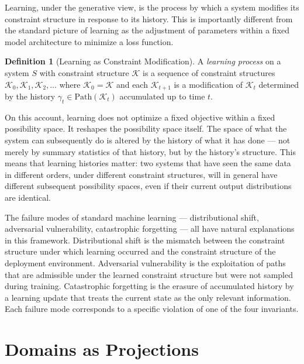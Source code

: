 \documentclass[12pt, twoside]{article}
\theoremstyle{plain}
\theoremstyle{definition}
\newtheorem{definition}[theorem]{Definition}
\theoremstyle{remark}
\begin{document}
Learning, under the generative view, is the process by which a system
modifies its constraint structure in response to its history.
This is importantly different from the standard picture of learning
as the adjustment of parameters within a fixed model architecture
to minimize a loss function.

\begin{definition}[Learning as Constraint Modification]
A \emph{learning process} on a system $S$ with constraint structure
$\mathcal{K}$ is a sequence of constraint structures
$\mathcal{K}_0, \mathcal{K}_1, \mathcal{K}_2, \ldots$
where $\mathcal{K}_0 = \mathcal{K}$ and each $\mathcal{K}_{t+1}$
is a modification of $\mathcal{K}_t$ determined by the history
$\gamma_t \in \mathrm{Path}(\mathcal{K}_t)$ accumulated up to time $t$.
\end{definition}

On this account, learning does not optimize a fixed objective within
a fixed possibility space.
It reshapes the possibility space itself.
The space of what the system can subsequently do is altered by
the history of what it has done — not merely by summary statistics
of that history, but by the history's structure.
This means that learning histories matter: two systems that have
seen the same data in different orders, under different constraint
structures, will in general have different subsequent possibility spaces,
even if their current output distributions are identical.

The failure modes of standard machine learning —
distributional shift, adversarial vulnerability, catastrophic forgetting —
all have natural explanations in this framework.
Distributional shift is the mismatch between the constraint structure
under which learning occurred and the constraint structure of the
deployment environment.
Adversarial vulnerability is the exploitation of paths that are
admissible under the learned constraint structure but were not
sampled during training.
Catastrophic forgetting is the erasure of accumulated history
by a learning update that treats the current state as the only
relevant information.
Each failure mode corresponds to a specific violation of one of
the four invariants.

\newpage

\section{Domains as Projections}
\end{document}
